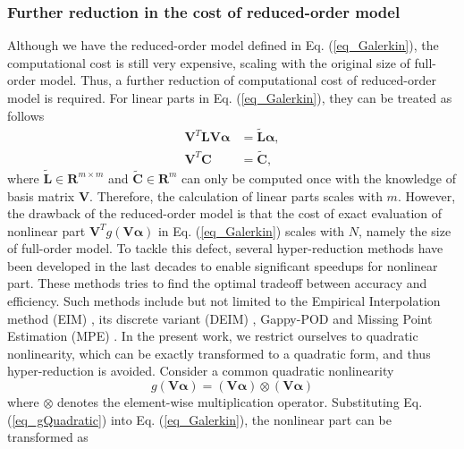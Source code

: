 \documentclass[preprint, 10pt]{elsarticle}
\begin{document}
\subsubsection{Further reduction in the cost of reduced-order model}
Although we have the reduced-order model defined in Eq. (\ref{eq_Galerkin}), the computational cost is still very expensive, scaling with the original size of full-order model. Thus, a further reduction of computational cost of reduced-order model is required. For linear parts in Eq. (\ref{eq_Galerkin}), they can be treated as follows
\begin{equation}
\begin{aligned}
\mathbf{V}^T \mathbf{L} \mathbf{V} \pmb{\alpha}  &= \tilde {\mathbf{L}} \pmb{\alpha}, \\
\mathbf{V}^T \mathbf{C}                          &= \tilde {\mathbf{C}},
\end{aligned}
\label{eq_ReductionLinear}
\end{equation}
where $\tilde {\mathbf{L}} \in \mathbf{R}^{m \times m}$ and $\tilde {\mathbf{C}} \in \mathbf{R}^{m} $ can only be computed once with the knowledge of basis matrix $\mathbf{V}$.
Therefore, the calculation of linear parts scales with $m$. However, the drawback of the reduced-order model is that the cost of exact evaluation of nonlinear part $\mathbf{V}^T g \left( \mathbf{V} \pmb{\alpha} \right)$  in Eq. (\ref{eq_Galerkin}) scales with $N$, namely the size of full-order model. To tackle this defect, several hyper-reduction methods have been developed in the last decades to enable significant speedups for nonlinear part. These methods tries to find the optimal tradeoff between accuracy and efficiency. Such methods include but not limited to the Empirical Interpolation method (EIM) \cite{barrault2004empirical}, its
discrete variant (DEIM) \cite{chaturantabut2010nonlinear}, Gappy-POD \cite{everson1995karhunen}and Missing Point Estimation (MPE) \cite{astrid2008missing}. In the present work, we restrict ourselves to quadratic nonlinearity, which can be exactly transformed to a quadratic form, and thus hyper-reduction is avoided. Consider a common quadratic nonlinearity
\begin{equation}
g \left( \mathbf{V} \pmb{\alpha} \right)
=
\left( \mathbf{V} \pmb{\alpha} \right) \otimes \left( \mathbf{V} \pmb{\alpha} \right)
\label{eq_gQuadratic}
\end{equation}
where $\otimes$ denotes the element-wise multiplication operator. Substituting Eq. (\ref{eq_gQuadratic}) into Eq. (\ref{eq_Galerkin}), the nonlinear part can be transformed as
\end{document}
